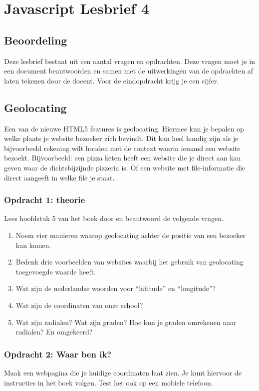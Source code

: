 \documentclass[a4paper]{report}
\begin{document}
\chapter*{\textcolor{seccol}{Javascript} Lesbrief 4}

\section*{Beoordeling}
Deze lesbrief bestaat uit een aantal vragen en opdrachten. Deze vragen moet je in een document beantwoorden en samen met de uitwerkingen van de opdrachten af laten tekenen door de docent. Voor de eindopdracht krijg je een cijfer.

\section*{Geolocating}
Een van de nieuwe HTML5 features is geolocating. Hiermee kun je bepalen op welke plaats je website bezoeker zich bevindt. Dit kan heel handig zijn als je bijvoorbeeld rekening wilt houden met de context waarin iemand een website bezoekt. Bijvoorbeeld: een pizza keten heeft een website die je direct aan kan geven waar de dichtsbijzijnde pizzeria is. Of een website met file-informatie die direct aangeeft in welke file je staat.

\subsection*{Opdracht 1: theorie}
Lees hoofdstuk 5 van het boek door en beantwoord de volgende vragen. 

\begin{enumerate}
	\item Noem vier manieren waarop geolocating achter de positie van een bezoeker kan komen.
	\item Bedenk drie voorbeelden van websites waarbij het gebruik van geolocating toegevoegde waarde heeft.
	\item Wat zijn de nederlandse woorden voor ``latitude'' en ``longitude''?
	\item Wat zijn de coordinaten van onze school?
	\item Wat zijn radialen? Wat zijn graden? Hoe kun je graden omrekenen naar radialen? En omgekeerd?
\end{enumerate}

\subsection*{Opdracht 2: Waar ben ik?}
Maak een webpagina die je huidige coordinaten laat zien. Je kunt hiervoor de instructies in het boek volgen. Test het ook op een mobiele telefoon.
\end{document}
